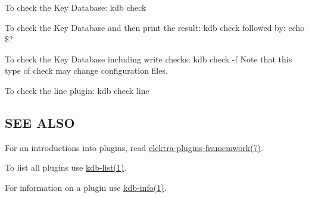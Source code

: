 To check the Key Database\+: {\ttfamily kdb check}

To check the Key Database and then print the result\+: {\ttfamily kdb check} followed by\+: {\ttfamily echo \$?}

To check the Key Database including write checks\+: {\ttfamily kdb check -\/f} Note that this type of check may change configuration files.

To check the {\ttfamily line} plugin\+: {\ttfamily kdb check line}

\subsection*{S\+E\+E A\+L\+S\+O}


\begin{DoxyItemize}
\item For an introductions into plugins, read \hyperlink{md_doc_help_elektra-plugins-framework_doc_help_elektra-plugins-framework_md}{elektra-\/plugins-\/framemwork(7)}.
\item To list all plugins use \hyperlink{md_doc_help_kdb-list_doc_help_kdb-list_md}{kdb-\/list(1)}.
\item For information on a plugin use \hyperlink{md_doc_help_kdb-info_doc_help_kdb-info_md}{kdb-\/info(1)}. 
\end{DoxyItemize}
